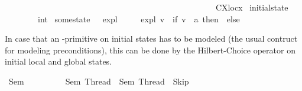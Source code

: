 \begin{isabellebody}
\ \ \ \ \ \ \ \ \ \ \ \ \ \ \ \ \ \ \ \ \ \ \ \ \ \ \ \ \ \ \ \ \ \ \ \ \ \ \ \ \ \ \ \ \ \ \ \ \ \ {\isasymrightarrow}\ C{\isacharparenleft}{\kern0pt}{\isasymsigma}{\isacharparenleft}{\kern0pt}X\isactrlsub l\isactrlsub o\isactrlsub c{\isacharcolon}{\kern0pt}{\isacharequal}{\kern0pt}x{\isacharparenright}{\kern0pt}{\isacharparenright}{\kern0pt}{\isacharparenright}{\kern0pt}{\isachardoublequoteclose}\isanewline
\isanewline
\isanewline
{}\isamarkupfalse%
\ initial{\isacharunderscore}{\kern0pt}state\ {\isacharcolon}{\kern0pt}{\isacharcolon}{\kern0pt}\ {\isasymsigma}\ {\isacharparenleft}{\kern0pt}{\isacartoucheopen}{\isasymsigma}\isanewline
\ \ \ \ \ {\isacartoucheopen}{\isasymsigma}\ {\isasymequiv}\ {\isacharparenleft}{\kern0pt}{\isasymlambda}{\isacharunderscore}{\kern0pt}{\isachardot}{\kern0pt}\ {}{\isacharcolon}{\kern0pt}{\isacharcolon}{\kern0pt}int{\isacharparenright}{\kern0pt}{\isacartoucheclose}\isanewline
\isanewline
{}\isamarkupfalse%
\ some{\isacharunderscore}{\kern0pt}state\ {\isacharcolon}{\kern0pt}{\isacharcolon}{\kern0pt}\ {\isasymsigma}\ {\isacharparenleft}{\kern0pt}{\isacartoucheopen}{\isasymsigma}\isactrlsub e\isactrlsub x\isactrlsub p\isactrlsub l{\isacartoucheclose}{\isacharparenright}{\kern0pt}\isanewline
\ \ \ \ \ {\isacartoucheopen}{\isasymsigma}\isactrlsub e\isactrlsub x\isactrlsub p\isactrlsub l\ v\ {\isasymequiv}\ if\ v\ {\isacharequal}{\kern0pt}\ {\isacharprime}{\kern0pt}{\isacharprime}{\kern0pt}a{\isacharprime}{\kern0pt}{\isacharprime}{\kern0pt}\ then\ {}\ else\ {}{\isacartoucheclose}%
\begin{isamarkuptext}%
In case that an -primitive on initial states has to be modeled
(the usual contruct for modeling preconditions), this can be done by the 
Hilbert-Choice operator  on initial local and global states.%
\end{isamarkuptext}\isamarkuptrue%
\isamarkupfalse%
\ Sem\ \ \ \ \ \ \ \ \ \ {\isacartoucheopen}Sem\ Thread\ {\isasymequiv}\ Sem\ Thread\ {\isacharparenleft}{\kern0pt}{\isasymlambda}{\isacharunderscore}{\kern0pt}{\isachardot}{\kern0pt}\ Skip{\isacharparenright}{\kern0pt}\ {\isasymsigma}\ \ \isanewline

\end{isabellebody}
